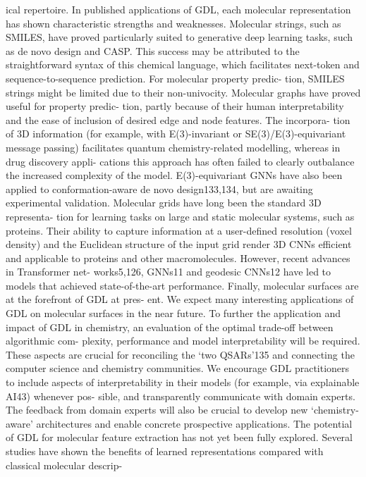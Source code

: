 ical repertoire. In published applications of GDL, each molecular
representation has shown characteristic strengths and weaknesses.
Molecular strings, such as SMILES, have proved particularly
suited to generative deep learning tasks, such as de novo design
and CASP. This success may be attributed to the straightforward
syntax of this chemical language, which facilitates next-token and
sequence-to-sequence prediction. For molecular property predic-
tion, SMILES strings might be limited due to their non-univocity.
Molecular graphs have proved useful for property predic-
tion, partly because of their human interpretability and the ease
of inclusion of desired edge and node features. The incorpora-
tion of 3D information (for example, with E(3)-invariant or
SE(3)/E(3)-equivariant message passing) facilitates quantum
chemistry-related modelling, whereas in drug discovery appli-
cations this approach has often failed to clearly outbalance the
increased complexity of the model. E(3)-equivariant GNNs have
also been applied to conformation-aware de novo design133,134, but
are awaiting experimental validation.
Molecular grids have long been the standard 3D representa-
tion for learning tasks on large and static molecular systems, such
as proteins. Their ability to capture information at a user-defined
resolution (voxel density) and the Euclidean structure of the input
grid render 3D CNNs efficient and applicable to proteins and other
macromolecules. However, recent advances in Transformer net-
works5,126, GNNs11 and geodesic CNNs12 have led to models that
achieved state-of-the-art performance.
Finally, molecular surfaces are at the forefront of GDL at pres-
ent. We expect many interesting applications of GDL on molecular
surfaces in the near future.
To further the application and impact of GDL in chemistry,
an evaluation of the optimal trade-off between algorithmic com-
plexity, performance and model interpretability will be required.
These aspects are crucial for reconciling the ‘two QSARs’135 and
connecting the computer science and chemistry communities. We
encourage GDL practitioners to include aspects of interpretability
in their models (for example, via explainable AI43) whenever pos-
sible, and transparently communicate with domain experts. The
feedback from domain experts will also be crucial to develop new
‘chemistry-aware’ architectures and enable concrete prospective
applications.
The potential of GDL for molecular feature extraction has not
yet been fully explored. Several studies have shown the benefits of
learned representations compared with classical molecular descrip-
